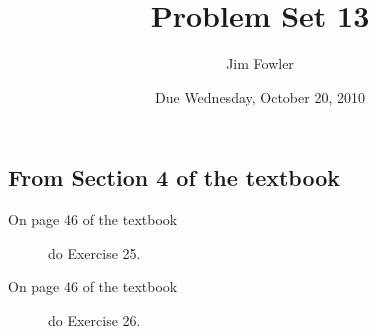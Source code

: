 \documentclass[12pt]{handout}
\author{Jim Fowler}
\title{Problem Set 13}
\date{Due Wednesday, October 20, 2010}
\begin{document}
\maketitle










\subsection*{From Section 4 of the textbook}



\begin{description}

\item[On page 46 of the textbook] do Exercise 25.

\item[On page 46 of the textbook] do Exercise 26.

\end{description}
\end{document}
